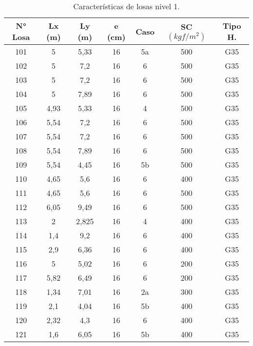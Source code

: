 \begin{table}[H]
  \centering
  \caption{Características de losas nivel 1.}
  \begin{tabular}{ccccccc}
    \hline
    \textbf{N° Losa} &      \textbf{Lx (m)} &      \textbf{Ly (m)} &      \textbf{e (cm)} &      \textbf{Caso} &      \textbf{SC $(kgf/m^2)$} &      \textbf{Tipo H.}      \bigstrut\\
    \hline
        101 &      5 &      5,33 &      16 &      5a &      500 &      G35      \bigstrut[t]\\
        102 &      5 &      7,2 &      16 &      6 &      500 &      G35      \\
        103 &      5 &      7,2 &      16 &      6 &      500 &      G35      \\
        104 &      5 &      7,89 &      16 &      6 &      500 &      G35      \\
        105 &      4,93 &      5,33 &      16 &      4 &      500 &      G35      \\
        106 &      5,54 &      7,2 &      16 &      6 &      500 &      G35      \\
        107 &      5,54 &      7,2 &      16 &      6 &      500 &      G35      \\
        108 &      5,54 &      7,89 &      16 &      6 &      500 &      G35      \\
        109 &      5,54 &      4,45 &      16 &      5b &      500 &      G35      \\
        110 &      4,65 &      5,6 &      16 &      6 &      400 &      G35      \\
        111 &      4,65 &      5,6 &      16 &      6 &      500 &      G35      \\
        112 &      6,05 &      9,49 &      16 &      6 &      500 &      G35      \\
        113 &      2 &      2,825 &      16 &      4 &      400 &      G35      \\
        114 &      1,4 &      9,2 &      16 &      6 &      400 &      G35      \\
        115 &      2,9 &      6,36 &      16 &      6 &      400 &      G35      \\
        116 &      5 &      5,02 &      16 &      6 &      200 &      G35      \\
        117 &      5,82 &      6,49 &      16 &      6 &      200 &      G35      \\
        118 &      1,34 &      7,01 &      16 &      2a &      300 &      G35      \\
        119 &      2,1 &      4,04 &      16 &      5b &      400 &      G35      \\
        120 &      2,32 &      4,3 &      16 &      6 &      400 &      G35      \\
        121 &      1,6 &      6,05 &      16 &      5b &      400 &      G35      \bigstrut[b]\\
        \hline
      \end{tabular}
      \label{losas1}
    \end{table}

